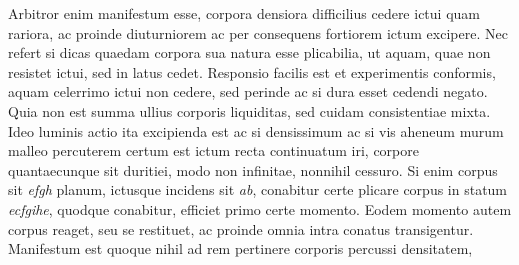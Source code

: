 %
Arbitror enim
manifestum esse,
corpora densiora difficilius cedere ictui%
%
quam rariora,%
ac proinde diuturniorem
ac per consequens fortiorem
ictum excipere.%
%
%
%
Nec refert
si dicas
quaedam corpora sua natura%
esse plicabilia,%
ut aquam,%
quae non resistet ictui,
sed in latus cedet.
Responsio facilis est
et experimentis conformis,%
aquam celerrimo ictui non cedere,%
sed perinde
ac si dura esset
cedendi negato.%
Quia non est summa ullius corporis liquiditas,
sed cuidam consistentiae%
%
%
mixta.%
\pend%
\pstart%
Ideo luminis actio%
%
ita excipienda est%
ac si densissimum%
\bracks{,}
ac si vis aheneum%
\bracks{,}
murum%
malleo percuterem%
%
\bracks{:}
certum est
ictum recta continuatum iri,%
corpore quantaecunque sit duritiei,%
modo non infinitae,%
nonnihil cessuro.%
Si enim corpus sit \textit{efgh} planum,
ictusque incidens sit \textit{ab},%
conabitur certe plicare corpus%
in statum \textit{ecfgihe},%
quodque conabitur,
efficiet primo certe momento.%
Eodem momento autem corpus reaget,%
seu se restituet,%
ac proinde omnia intra conatus transigentur.%
%
Manifestum est quoque
nihil ad rem pertinere corporis percussi densitatem,%
%

